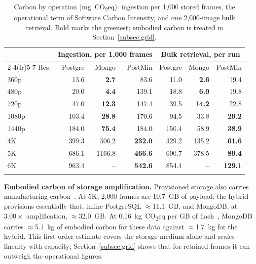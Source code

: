 \documentclass[pdflatex,sn-basic]{sn-jnl}%
\begin{document}
\begin{table}[htbp]
\caption{Carbon by operation (mg~CO\textsubscript{2}eq): ingestion per 1{,}000 stored frames, the operational term of Software Carbon Intensity, and one 2{,}000-image bulk retrieval. Bold marks the greenest; embodied carbon is treated in Section~\ref{subsec:grid}.}\label{tab:dimcarbon}\label{tab:sci}
\small
\setlength{\tabcolsep}{4pt}
\begin{tabular}{@{}lrrrrrr@{}}
\toprule
 & \multicolumn{3}{c}{Ingestion, per 1{,}000 frames} & \multicolumn{3}{c}{Bulk retrieval, per run} \\
\cmidrule(lr){2-4}\cmidrule(lr){5-7}
Res. & Postgre & Mongo & PostMin & Postgre & Mongo & PostMin \\
\midrule
360p  & 13.6 & \textbf{2.7} & 83.6 & 11.0 & \textbf{2.6} & 19.4 \\
480p  & 20.0 & \textbf{4.4} & 139.1 & 18.8 & \textbf{6.0} & 19.8 \\
720p  & 47.0 & \textbf{12.3} & 147.4 & 39.5 & \textbf{14.2} & 22.8 \\
1080p & 103.4 & \textbf{28.8} & 170.6 & 94.5 & 33.8 & \textbf{29.2} \\
1440p & 184.0 & \textbf{75.4} & 184.0 & 150.4 & 58.9 & \textbf{38.9} \\
4K    & 399.3 & 506.2 & \textbf{232.0} & 329.2 & 135.2 & \textbf{61.6} \\
5K    & 686.1 & 1166.8 & \textbf{466.6} & 600.7 & 378.5 & \textbf{89.4} \\
6K    & 963.4 & -- & \textbf{542.6} & 854.4 & -- & \textbf{129.1} \\
\botrule
\end{tabular}
\end{table}

\textbf{Embodied carbon of storage amplification.} Provisioned storage also carries manufacturing carbon~\citep{gupta_chasing_carbon,tannu_ssd_embodied}. At 5K, 2{,}000 frames are $10.7$~GB of payload; the hybrid provisions essentially that, inline PostgreSQL $\approx$11.1~GB, and MongoDB, at $3.00\times$ amplification, $\approx$32.0~GB. At 0.16~kg~CO\textsubscript{2}eq per GB of flash~\citep{tannu_ssd_embodied}, MongoDB carries $\approx$5.1~kg of embodied carbon for these data against $\approx$1.7~kg for the hybrid. This first-order estimate covers the storage medium alone and scales linearly with capacity; Section~\ref{subsec:grid} shows that for retained frames it can outweigh the operational figures.
\end{document}
